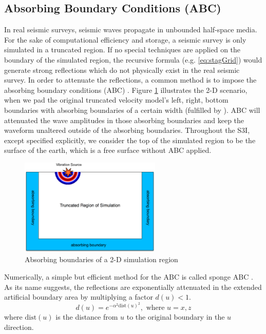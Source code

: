 \documentclass[11pt,titlepage]{article}
\theoremstyle{plain}
\theoremstyle{definition}
\theoremstyle{remark}
\numberwithin{equation}{section}
\begin{document}
\subsection{Absorbing Boundary Conditions (ABC)}
In real seismic surveys, seismic waves propagate in unbounded half-space media. For the sake of computational efficiency and storage, a seismic survey is only simulated in a truncated region. If no special techniques are applied on the boundary of the simulated region, the recursive formula (e.g. \eqref{eq:stagGrid}) would generate strong reflections which do not physically exist in the real seismic survey. In order to attenuate the reflections, a common method is to impose the absorbing boundary conditions (ABC) \cite{Engquist:1977aa, Clayton:1977aa}. Figure \ref{fig:ABC} illustrates the 2-D scenario, when we pad the original truncated velocity model's left, right, bottom boundaries with absorbing boundaries of a certain width (fulfilled by ). ABC will attenuated the wave amplitudes in those absorbing boundaries and keep the waveform unaltered outside of the absorbing boundaries. Throughout the S3I, except specified explicitly, we consider the top of the simulated region to be the surface of the earth, which is a free surface without ABC applied.

\begin{figure}[htbp]
\centering
\includegraphics[width=0.6\textwidth]{Fig/ABC}
\caption{Absorbing boundaries of a 2-D simulation region}
\label{fig:ABC}
\end{figure}

Numerically, a simple but efficient method for the ABC is called sponge ABC \cite{Cerjan:1985aa}. As its name suggests, the reflections are exponentially attenuated in the extended artificial boundary area by multiplying a factor $d(u) < 1$.
\begin{equation}
d(u) = e^{-\alpha^2\text{dist}(u)^2}, \mbox{  where  } u=x, z
\end{equation}
where $\text{dist}(u)$ is the distance from $u$ to the original boundary in the $u$ direction. 
\end{document}
